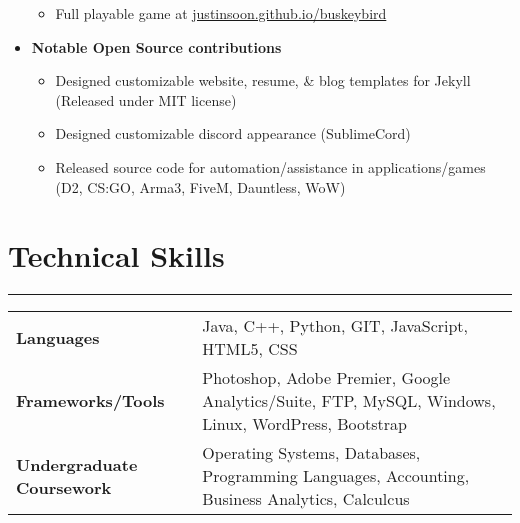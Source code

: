 \documentclass[a4paper]{article}
\begin{document}
\begin{itemize}
\begin{itemize}
		\item Full playable game at \href{http://justinsoon.github.io/BuskeyBird/}{justinsoon.github.io/buskeybird}
	      \end{itemize}
	\item
	      \textbf{Notable Open Source contributions}
	      \begin{itemize}
	      	\vspace{-2mm} \setlength\itemsep{-0.7mm}
	      	\item Designed customizable website, resume, \& blog templates for Jekyll (Released under MIT license)
	      	\item Designed customizable discord appearance (SublimeCord)
	      	\item Released source code for automation/assistance in applications/games (D2, CS:GO, Arma3, FiveM, Dauntless, WoW)
	      \end{itemize}
\end{itemize}

\section*{Technical Skills}
\hrule
\vspace{3mm}
\begin{tabular}{@{}m{40mm}m{130mm}@{}}
	\textbf{\textrm{Languages}}        & Java, C++, Python, GIT, JavaScript, HTML5, CSS\\
	\textbf{\textrm{Frameworks/Tools}} & Photoshop, Adobe Premier, Google Analytics/Suite, FTP, MySQL, Windows, Linux, WordPress, Bootstrap\\
	\textbf{\textrm{Undergraduate Coursework}} & Operating Systems, Databases, Programming Languages, Accounting, Business Analytics, Calculcus\\
\end{tabular}

\end{document}
